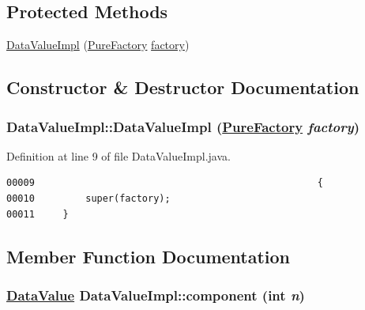 \subsection*{Protected Methods}
\begin{CompactItemize}
\item 
\hyperlink{classDataValueImpl_b0}{Data\-Value\-Impl} (\hyperlink{classPureFactory}{Pure\-Factory} \hyperlink{classDataImpl_o0}{factory})
\end{CompactItemize}


\subsection{Constructor \& Destructor Documentation}
\hypertarget{classDataValueImpl_b0}{
\subsubsection[DataValueImpl]{\setlength{\rightskip}{0pt plus 5cm}Data\-Value\-Impl::Data\-Value\-Impl (\hyperlink{classPureFactory}{Pure\-Factory} {\em factory})}}
\label{classDataValueImpl_b0}




Definition at line 9 of file Data\-Value\-Impl.java.\footnotesize\begin{verbatim}00009                                                  {
00010         super(factory);
00011     }
\end{verbatim}\normalsize 


\subsection{Member Function Documentation}
\hypertarget{classDataValueImpl_a4}{
\subsubsection[component]{\setlength{\rightskip}{0pt plus 5cm}\hyperlink{interfaceDataValue}{Data\-Value} Data\-Value\-Impl::component (int {\em n})}}
\label{classDataValueImpl_a4}





